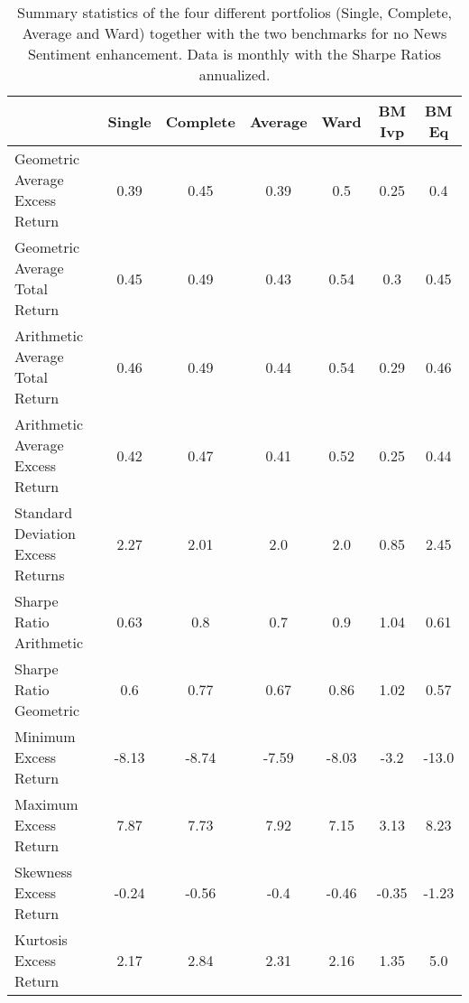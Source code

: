 \begin{table}[h]
\centering
    \begin{tabular}{lcccccc}
                         & Single & Complete & Average & Ward  & BM Ivp & BM Eq  \\
    \midrule
    Geometric Average Excess Return      & 0.39   & 0.45     & 0.39    & 0.5   & 0.25   & 0.4   \\
Geometric Average Total Return   & 0.45   & 0.49     & 0.43    & 0.54  & 0.3    & 0.45  \\
Arithmetic Average Total Return & 0.46   & 0.49     & 0.44    & 0.54  & 0.29   & 0.46  \\
Arithmetic Average Excess Return    & 0.42   & 0.47     & 0.41    & 0.52  & 0.25   & 0.44  \\
Standard Deviation Excess Returns         & 2.27   & 2.01     & 2.0     & 2.0   & 0.85   & 2.45  \\
Sharpe Ratio Arithmetic     & 0.63   & 0.8      & 0.7     & 0.9   & 1.04   & 0.61  \\
Sharpe Ratio Geometric      & 0.6    & 0.77     & 0.67    & 0.86  & 1.02   & 0.57  \\
Minimum Excess Return          & -8.13  & -8.74    & -7.59   & -8.03 & -3.2   & -13.0 \\
Maximum Excess Return          & 7.87   & 7.73     & 7.92    & 7.15  & 3.13   & 8.23  \\
Skewness Excess Return         & -0.24  & -0.56    & -0.4    & -0.46 & -0.35  & -1.23 \\
Kurtosis Excess Return         & 2.17   & 2.84     & 2.31    & 2.16  & 1.35   & 5.0  \\
    \bottomrule
    \end{tabular}
    \\[5pt]
     \captionsetup{width=0.925\linewidth}
     \caption[Summary statistics of the four different portfolios together with the two benchmark for no News Sentiment enhancement.]{Summary statistics of the four different portfolios (Single, Complete, Average and Ward) together with the two benchmarks for no News Sentiment enhancement. Data is monthly with the Sharpe Ratios annualized.}
    \label{stats}
\end{table}




%




